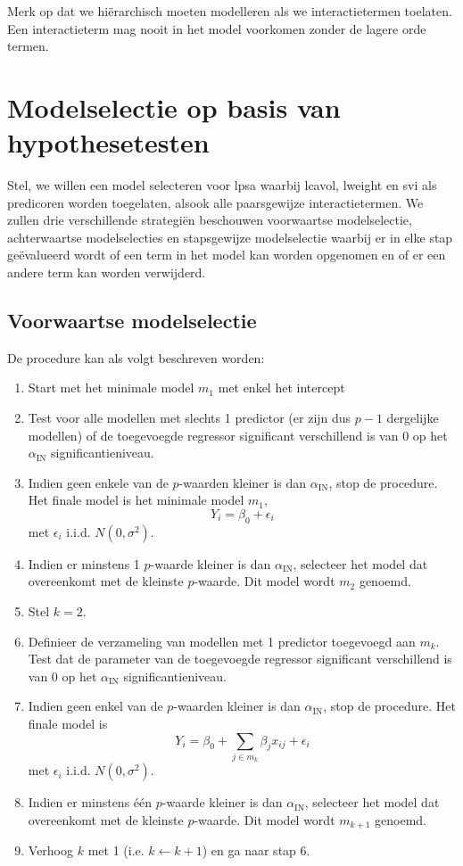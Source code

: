 \documentclass[12pt,dutch,coursenotes]{book}
\providecommand{\tightlist}{%
  \setlength{\itemsep}{0pt}\setlength{\parskip}{0pt}}
\theoremstyle{definition}
\theoremstyle{definition}
\theoremstyle{definition}
\theoremstyle{remark}
\begin{document}
Merk op dat we hiërarchisch moeten modelleren als we interactietermen
toelaten. Een interactieterm mag nooit in het model voorkomen zonder de
lagere orde termen.

\section{Modelselectie op basis van
hypothesetesten}\label{modelselectie-op-basis-van-hypothesetesten}

Stel, we willen een model selecteren voor lpsa waarbij lcavol, lweight
en svi als predicoren worden toegelaten, alsook alle paarsgewijze
interactietermen. We zullen drie verschillende strategiën beschouwen
voorwaartse modelselectie, achterwaartse modelselecties en stapsgewijze
modelselectie waarbij er in elke stap geëvalueerd wordt of een term in
het model kan worden opgenomen en of er een andere term kan worden
verwijderd.

\subsection{Voorwaartse modelselectie}\label{voorwaartse-modelselectie}

De procedure kan als volgt beschreven worden:

\begin{enumerate}
\def\labelenumi{\arabic{enumi}.}
\tightlist
\item
  Start met het minimale model \(m_1\) met enkel het intercept
\item
  Test voor alle modellen met slechts 1 predictor (er zijn dus \(p-1\)
  dergelijke modellen) of de toegevoegde regressor significant
  verschillend is van 0 op het \(\alpha_{\text{IN}}\)
  significantieniveau.
\item
  Indien geen enkele van de \(p\)-waarden kleiner is dan
  \(\alpha_{\text{IN}}\), stop de procedure. Het finale model is het
  minimale model \(m_1\), \[
     Y_i = \beta_0 + \epsilon_i 
   \] met \(\epsilon_i \text{ i.i.d. } N(0,\sigma^2)\).
\item
  Indien er minstens 1 \(p\)-waarde kleiner is dan
  \(\alpha_{\text{IN}}\), selecteer het model dat overeenkomt met de
  kleinste \(p\)-waarde. Dit model wordt \(m_2\) genoemd.
\item
  Stel \(k=2\).
\item
  Definieer de verzameling van modellen met 1 predictor toegevoegd aan
  \(m_{k}\). Test dat de parameter van de toegevoegde regressor
  significant verschillend is van 0 op het \(\alpha_{\text{IN}}\)
  significantieniveau.
\item
  Indien geen enkel van de \(p\)-waarden kleiner is dan
  \(\alpha_{\text{IN}}\), stop de procedure. Het finale model is \[
     Y_i = \beta_0 + \sum_{j \in m_k} \beta_j x_{ij} + \epsilon_i 
   \] met \(\epsilon_i \text{ i.i.d. } N(0,\sigma^2)\).
\item
  Indien er minstens één \(p\)-waarde kleiner is dan
  \(\alpha_{\text{IN}}\), selecteer het model dat overeenkomt met de
  kleinste \(p\)-waarde. Dit model wordt \(m_{k+1}\) genoemd.
\item
  Verhoog \(k\) met 1 (i.e. \(k\leftarrow k+1\)) en ga naar stap 6.
\end{enumerate}
\end{document}
